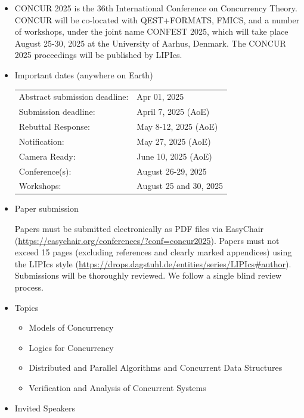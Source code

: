 \documentclass[prodmode,acmtecs]{acmsmall} %
\begin{document}
\begin{itemize}\item  CONCUR 2025 is the 36th International Conference on Concurrency Theory. CONCUR will be co-located with QEST+FORMATS, FMICS, and a number of workshops, under the joint name CONFEST 2025, which will take place August 25-30, 2025 at the University of Aarhus, Denmark. The CONCUR 2025 proceedings will be published by LIPIcs. 
 
\item  Important dates (anywhere on Earth) 
 
\begin{tabulary}{\linewidth}{LL}Abstract submission deadline:  & Apr 01, 2025 \\
Submission deadline:  & April 7, 2025 (AoE) \\
Rebuttal Response:  & May 8-12, 2025 (AoE) \\
Notification:  & May 27, 2025 (AoE) \\
Camera Ready:  & June 10, 2025 (AoE) \\
Conference(s):  & August 26-29, 2025 \\
Workshops:  & August 25 and 30, 2025 \\
\end{tabulary}
 
\item  Paper submission 
 
  Papers must be submitted electronically as PDF files via EasyChair (\href{https://easychair.org/conferences/?conf=concur2025}{https://easychair.org/conferences/?conf=concur2025}). Papers must not exceed 15 pages (excluding references and clearly marked appendices) using the LIPIcs style (\href{https://drops.dagstuhl.de/entities/series/LIPIcs#author}{https://drops.dagstuhl.de/entities/series/LIPIcs\#author}). Submissions will be thoroughly reviewed. We follow a single blind review process. 
 
\item  Topics 
 
\begin{itemize}\item  Models of Concurrency
\item  Logics for Concurrency
\item  Distributed and Parallel Algorithms and Concurrent Data Structures
\item  Verification and Analysis of Concurrent Systems
\end{itemize} 
\item  Invited Speakers 
 

\end{itemize}
\end{document}
